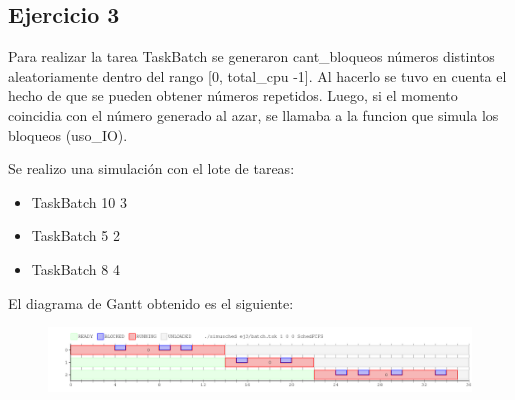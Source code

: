 \subsection{Ejercicio 3}

Para realizar la tarea TaskBatch se generaron cant_bloqueos números distintos aleatoriamente dentro del rango [0, total_cpu -1]. Al hacerlo se tuvo en cuenta el hecho de que se pueden obtener números repetidos.
Luego, si el momento coincidia con el número generado al azar, se llamaba a la funcion que simula los bloqueos (uso_IO).

Se realizo una simulación con el lote de tareas:

\begin{itemize}

\item TaskBatch 10 3
\item TaskBatch 5 2
\item TaskBatch 8 4

\end{itemize}

El diagrama de Gantt obtenido es el siguiente:

\begin{figure}[h]
  \includegraphics[width=\textwidth]{../ej3/salida.png}
  \caption{}
\end{figure}

